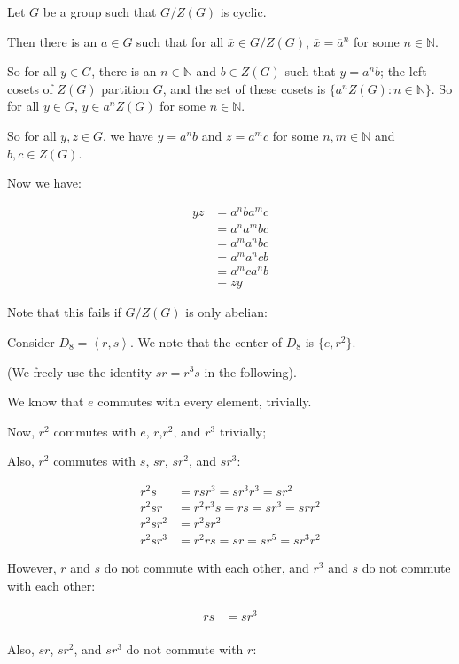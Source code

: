 \documentclass[a4paper,12pt]{article}
\newcommand{\tab}{\hspace{4mm}} %
\newcommand{\anbrack}[1]{\left\langle #1 \right\rangle}
\newcommand{\N}{\mathbb{N}}
\begin{document}
Let $G$ be a group such that $G/Z(G)$ is cyclic.

Then there is an $a \in G$ such that for all $\overline{x} \in G/Z(G)$, $\overline{x} = \overline{a}^n$ for some $n \in \N$.

So for all $y \in G$, there is an $n \in \N$ and $b \in Z(G)$ such that $y = a^nb$; the left cosets of $Z(G)$ partition $G$, and the set of these cosets is $\{a^nZ(G): n \in \N\}$. So for all $y \in G$, $y \in a^nZ(G)$ for some $n \in \N$. 

So for all $y, z \in G$, we have $y = a^nb$ and $z=a^mc$ for some $n,m \in \N$ and $b,c \in Z(G)$.

Now we have:

\begin{align*}
yz &= a^nba^mc\\
&=a^na^mbc\\
&=a^ma^nbc\\
&=a^ma^ncb\\
&=a^mca^nb\\
&=zy
\end{align*}

Note that this fails if $G/Z(G)$ is only abelian:

\tab Consider $D_8=\anbrack{r,s}$. We note that the center of $D_8$ is $\{e,r^2\}$.

\tab (We freely use the identity $sr = r^3s$ in the following).

\tab \tab We know that $e$ commutes with every element, trivially.

\tab \tab Now, $r^2$ commutes with $e$, $r$,$r^2$, and $r^3$ trivially; %

\tab \tab Also, $r^2$ commutes with $s$, $sr$, $sr^2$, and $sr^3$:

\begin{align*}
r^2s &= rsr^3 = sr^3r^3 = sr^2\\
r^2sr &= r^2r^3s = rs = sr^3 = srr^2 \\ 
r^2sr^2 &= r^2sr^2\\
r^2sr^3 &= r^2rs = sr = sr^5=sr^3r^2
\end{align*}

\tab \tab However, $r$ and $s$ do not commute with each other, and $r^3$ and $s$ do not commute with each other:

\begin{align*}
rs &= sr^3\\
\end{align*}

\tab \tab Also, $sr$, $sr^2$, and $sr^3$ do not commute with $r$:
\end{document}
